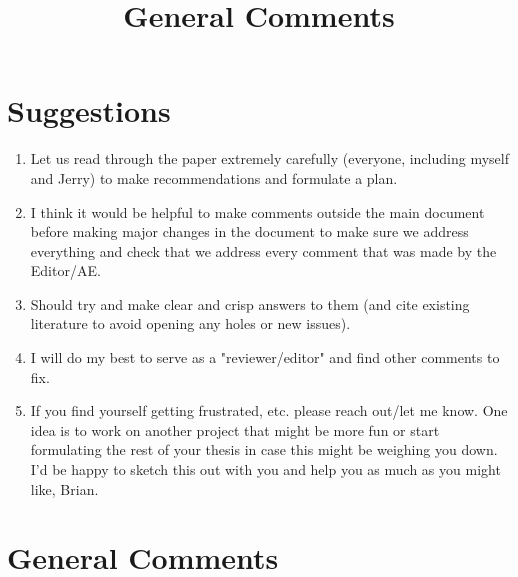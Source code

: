 \documentclass{article}
\begin{document}
\title{General Comments}
\author{}
\date{}
\maketitle


\section{Suggestions}

\begin{enumerate}
\item Let us read through the paper extremely carefully (everyone, including myself and Jerry) to make recommendations and formulate a plan. 
\item I think it would be helpful to make comments outside the main document before making major changes in the document to make sure we address everything and check that we address every comment that was made by the Editor/AE. 
\item Should try and make clear and crisp answers to them (and cite existing literature to avoid opening any holes or new issues). 
\item I will do my best to serve as a "reviewer/editor" and find other comments to fix. 
\item If you find yourself getting frustrated, etc. please reach out/let me know. One idea is to work on another project that might be more fun or start formulating the rest of your thesis in case this might be weighing you down. I'd be happy to sketch this out with you and help you as much as you might like, Brian.
\end{enumerate}


\section{General Comments}
\end{document}
